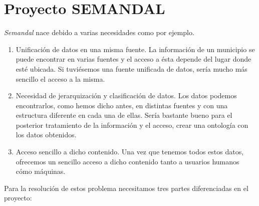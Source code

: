 \section*{Proyecto SEMANDAL}

 \textit{Semandal} nace debido a varias necesidades como por ejemplo.
 
 \begin{enumerate}
 \item Unificación de datos en una misma fuente.
 La información de un municipio se puede encontrar en varias fuentes y el acceso a ésta depende del lugar donde esté ubicada. Si tuviésemos una fuente unificada de datos, sería mucho más sencillo el acceso a la misma.
 \item Necesidad de jerarquización y clasificación de datos.
 Los datos podemos encontrarlos, como hemos dicho antes, en distintas fuentes y con una estructura diferente en cada una de ellas. Sería bastante bueno para el posterior tratamiento de la información y el acceso, crear una ontología con los datos obtenidos.
 
 \item Acceso sencillo a dicho contenido.
 Una vez que tenemos todos estos datos, ofrecemos un sencillo acceso a dicho contenido tanto a usuarios humanos cómo máquinas. 
\end{enumerate}  

 Para la resolución de estos problema necesitamos tres partes diferenciadas en el proyecto:

